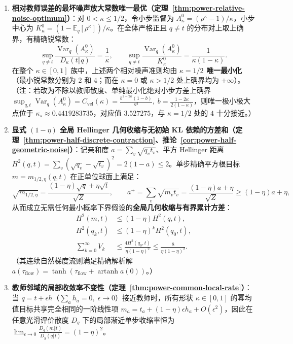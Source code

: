 \documentclass[lang=cn,scheme=chinese,openany]{../book/elegantbook}
\newcommand{\E}{\mathbb E}
\newcommand{\Var}{\operatorname{Var}}
\begin{document}
\begin{theorem}[平方根形状 $\kappa=1/2$ 的相对误差噪声最优性与全局 $(1-\eta)$ Hellinger 收缩]
\label{thm:power-relative-noise-optimum}
\label{thm:power-half-discrete-contraction}
\label{cor:power-half-geometric-noise}
\label{thm:power-common-local-rate}
\begin{enumerate}
\item \textbf{相对教师误差的最坏噪声放大常数唯一最优（定理~\ref{thm:power-relative-noise-optimum}）}：对 $0<\kappa\le 1/2$，令小步监督为 $A_\kappa^0=(\rho^\kappa-1)/\kappa$，小步中心为 $K_\kappa^0=(1-\E_q[\rho^\kappa])/\kappa$。在全体严格正且 $q\ne t$ 的分布对上取上确界，有精确锐常数：
\begin{equation}
 \sup_{q\ne t}\frac{\Var_q(A_\kappa^0)}{D_\kappa(t\Vert q)}=\frac1\kappa,\qquad
 \sup_{q\ne t}\frac{\Var_q(A_\kappa^0)}{K_\kappa^0}=\frac1{\kappa(1-\kappa)}.
 \label{eq:power-relative-noise-sharp}
\end{equation}
在整个 $\kappa\in[0,1]$ 族中，上述两个相对噪声准则均由 \textbf{$\kappa=1/2$ 唯一最小化}（最小锐常数分别为 $2$ 和 $4$；而在 $\kappa=0$ 或 $\kappa>1/2$ 处上确界均为 $+\infty$）。（注：若改为不除以教师散度、单纯最小化绝对小步方差上确界 $\sup_{q,t}\Var_q(A_\kappa^0)=C_{\mathrm{vel}}(\kappa)=\frac{b^{1-2\kappa}(1-b)}{\kappa^2},\; b=\frac{1-2\kappa}{2(1-\kappa)}$，则唯一极小极大点位于 $\kappa_\star\approx 0.4419283735$，对应值 $3.527275$，与 $\kappa=1/2$ 处的 $4$ 十分接近。）
\item \textbf{显式 $(1-\eta)$ 全局 Hellinger 几何收缩与无初始 KL 依赖的方差和（定理~\ref{thm:power-half-discrete-contraction}、推论~\ref{cor:power-half-geometric-noise}）}：记亲和度 $a=\sum_v\sqrt{q_v t_v}$、平方 Hellinger 距离 $H^2(q,t)=\sum_v(\sqrt{q_v}-\sqrt{t_v})^2=2(1-a)\le 2$。单步精确平方根目标 $m=m_{1/2,\eta}(q,t)$ 在正单位球面上满足：
\begin{equation}
 \sqrt{m_{1/2,\eta}}=\frac{(1-\eta)\sqrt{q}+\eta\sqrt{t}}{\sqrt{Z}},
 \qquad a^+=\sum_v\sqrt{m_v t_v}=\frac{(1-\eta)a+\eta}{\sqrt{Z}}\ge(1-\eta)a+\eta,
 \label{eq:power-half-normalized-chord}
\end{equation}
从而成立无需任何最小概率下界假设的\textbf{全局几何收缩与有界累计方差}：
\begin{equation}
 \boxed{\begin{aligned}
 H^2(m,t)&\le(1-\eta)H^2(q,t),\\
 H^2(q_k,t)&\le(1-\eta)^k H^2(q_0,t),\\
 \sum_{k=0}^\infty V_k&\le\frac{4H^2(q_0,t)}{\eta(1-\eta)^2}\le\frac{8}{\eta(1-\eta)^2}.
 \end{aligned}}
 \label{eq:power-half-discrete-progress}
\end{equation}
（其连续自然梯度流则满足精确解析解 $a(\tau_{\mathrm{flow}})=\tanh(\tau_{\mathrm{flow}}+\operatorname{artanh}a(0))$。）
\item \textbf{教师邻域的局部收敛率不变性（定理~\ref{thm:power-common-local-rate}）}：当 $q=t+\epsilon h$（$\sum_a h_a=0,\;\epsilon\to 0$）接近教师时，所有形状 $\kappa\in[0,1]$ 的幂均值目标共享完全相同的一阶线性项 $m_a=t_a+(1-\eta)\epsilon h_a+O(\epsilon^2)$，因此在任意光滑评价散度 $D_g$ 下的局部渐近单步收缩率恒为 $\lim_{\epsilon\to 0}\frac{D_g(m\Vert t)}{D_g(q\Vert t)}=(1-\eta)^2$。
\end{enumerate}
\end{theorem}
\end{document}
